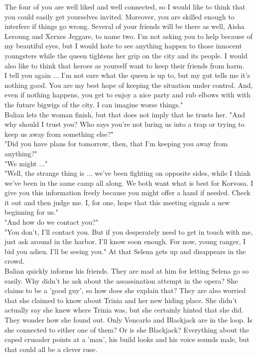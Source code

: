 The four of you are well liked and well connected, so I would like to think that you could easily get yourselves invited. Moreover, you are skilled enough to interfere if things go wrong. Several of your friends will be there as well, Aisha Leroung and Xerxes Jeggare, to name two. I'm not asking you to help because of my beautiful eyes, but I would hate to see anything happen to those innocent youngsters while the queen tightens her grip on the city and its people. I would also like to think that heroes as yourself want to keep their friends from harm.\\

I tell you again ... I'm not sure what the queen is up to, but my gut tells me it's nothing good. You are my best hope of keeping the situation under control. And, even if nothing happens, you get to enjoy a nice party and rub elbows with with the future bigwigs of the city. I can imagine worse things."\\

Balian lets the woman finish, but that does not imply that he trusts her. "And why should I trust you? Who says you're not luring us into a trap or trying to keep us away from something else?"\\

"Did you have plans for tomorrow, then, that I'm keeping you away from anything?"\\

"We might ..."\\

"Well, the strange thing is ... we've been fighting on opposite sides, while I think we've been in the same camp all along. We both want what is best for Korvosa. I give you this information freely because you might offer a hand if needed. Check it out and then judge me. I, for one, hope that this meeting signals a new beginning for us."\\

"And how do we contact you?"\\

"You don't, I'll contact you. But if you desperately need to get in touch with me, just ask around in the harbor. I'll know soon enough. For now, young ranger, I bid you adieu. I'll be seeing you." At that Selena gets up and disappears in the crowd.\\

Balian quickly informs his friends. They are mad at him for letting Selena go so easily. Why didn't he ask about the assassination attempt in the opera? She claims to be a 'good guy', so how does she explain that? They are also worried that she claimed to know about Trinia and her new hiding place. She didn't actually say she knew where Trinia was, but she certainly hinted that she did. They wonder how she found out. Only Vencarlo and Blackjack are in the loop. Is she connected to either one of them? Or is she Blackjack? Everything about the caped crusader points at a 'man', his build looks and his voice sounds male, but that could all be a clever ruse.\\

